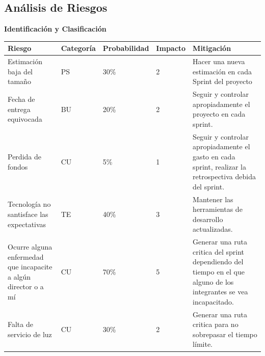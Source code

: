\documentclass[10pt]{article}
\begin{document}
\newpage
\subsection{Análisis de Riesgos}

\textbf{Identificación y Clasificación}

\begin{table}[htbp]
\begin{center}
\begin{tabular}{|p{2.2cm}|p{2.2cm}|p{2.2cm}|p{2.2cm}|p{2.2cm}|}
\hline
Riesgo & Categoría & Probabilidad & Impacto & Mitigación \\
\hline
Estimación baja del tamaño & PS & 30\% & 2 & Hacer una nueva estimación en cada Sprint del proyecto\\
\hline

Fecha de entrega equivocada & BU & 20\% & 2 & Seguir y controlar apropiadamente el proyecto en cada sprint. \\
\hline
Perdida de fondos & CU & 5\% & 1 & Seguir y controlar apropiadamente el gasto en cada sprint, realizar la retrospectiva debida del sprint. \\
\hline
Tecnología no santisface las expectativas & TE & 40\% & 3 & Mantener las herramientas de desarrollo actualizadas. \\
\hline
Ocurre alguna enfermedad que incapacite a algún director o a mí & CU & 70\% & 5 & Generar una ruta critica del sprint dependiendo del tiempo en el que alguno de los integrantes se vea incapacitado. \\
\hline
Falta de servicio de luz & CU & 30\% & 2 & Generar una ruta critica para no sobrepasar el tiempo límite. \\
\hline
\end{tabular}
\label{tabla2}
\end{center}
\end{table}
\end{document}
